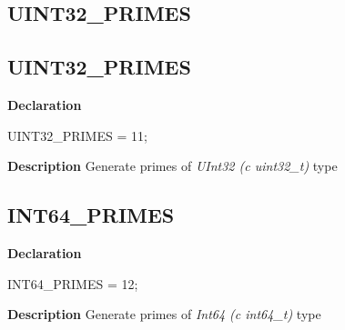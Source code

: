 \documentclass{report}
\newif\ifpdf
\begin{document}
\subsection*{\large{\textbf{UINT32{\_}PRIMES}}\normalsize\hspace{1ex}\hrulefill}
\else
\subsection*{UINT32{\_}PRIMES}
\fi
\label{primesieve-UINT32_PRIMES}
\begin{list}{}{
\setlength{\itemindent}{0cm}
\setlength{\listparindent}{0cm}
\setlength{\leftmargin}{\evensidemargin}
\addtolength{\leftmargin}{\tmplength}
\settowidth{\labelsep}{X}
\addtolength{\leftmargin}{\labelsep}
\setlength{\labelwidth}{\tmplength}
}
\item[\textbf{Declaration}\hfill]
\ifpdf
\begin{flushleft}
\fi
\begin{ttfamily}
UINT32{\_}PRIMES = 11;\end{ttfamily}

\ifpdf
\end{flushleft}
\fi

\par
\item[\textbf{Description}]
Generate primes of \textit{UInt32 (c uint32{\_}t)} type

\end{list}
\ifpdf
\subsection*{\large{\textbf{INT64{\_}PRIMES}}\normalsize\hspace{1ex}\hrulefill}
\else
\subsection*{INT64{\_}PRIMES}
\fi
\label{primesieve-INT64_PRIMES}
\begin{list}{}{
\setlength{\itemindent}{0cm}
\setlength{\listparindent}{0cm}
\setlength{\leftmargin}{\evensidemargin}
\addtolength{\leftmargin}{\tmplength}
\settowidth{\labelsep}{X}
\addtolength{\leftmargin}{\labelsep}
\setlength{\labelwidth}{\tmplength}
}
\item[\textbf{Declaration}\hfill]
\ifpdf
\begin{flushleft}
\fi
\begin{ttfamily}
INT64{\_}PRIMES = 12;\end{ttfamily}

\ifpdf
\end{flushleft}
\fi

\par
\item[\textbf{Description}]
Generate primes of \textit{Int64 (c int64{\_}t)} type

\end{list}
\ifpdf
\end{document}
